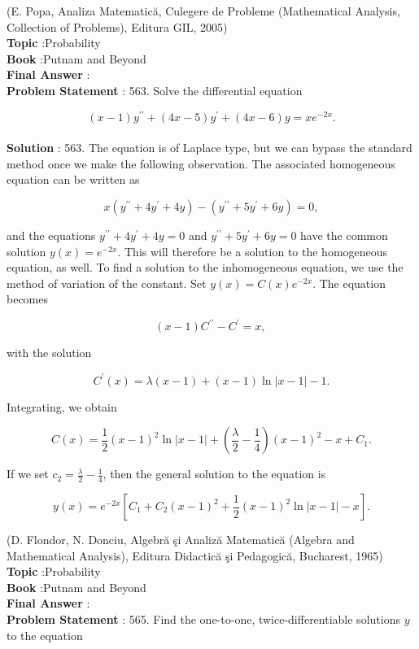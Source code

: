 \documentclass[10pt]{article}
\begin{document}
(E. Popa, Analiza Matematică, Culegere de Probleme (Mathematical Analysis, Collection of Problems), Editura GIL, 2005)
\\
\textbf{Topic} :Probability\\
\textbf{Book} :Putnam and Beyond\\
\textbf{Final Answer} :\\


\textbf{Problem Statement} :
563. Solve the differential equation

$$
(x-1) y^{\prime \prime}+(4 x-5) y^{\prime}+(4 x-6) y=x e^{-2 x} .
$$
\\
\textbf{Solution} :
563. The equation is of Laplace type, but we can bypass the standard method once we make the following observation. The associated homogeneous equation can be written as

$$
x\left(y^{\prime \prime}+4 y^{\prime}+4 y\right)-\left(y^{\prime \prime}+5 y^{\prime}+6 y\right)=0,
$$

and the equations $y^{\prime \prime}+4 y^{\prime}+4 y=0$ and $y^{\prime \prime}+5 y^{\prime}+6 y=0$ have the common solution $y(x)=e^{-2 x}$. This will therefore be a solution to the homogeneous equation, as well. To find a solution to the inhomogeneous equation, we use the method of variation of the constant. Set $y(x)=C(x) e^{-2 x}$. The equation becomes

$$
(x-1) C^{\prime \prime}-C^{\prime}=x \text {, }
$$

with the solution

$$
C^{\prime}(x)=\lambda(x-1)+(x-1) \ln |x-1|-1 .
$$

Integrating, we obtain

$$
C(x)=\frac{1}{2}(x-1)^{2} \ln |x-1|+\left(\frac{\lambda}{2}-\frac{1}{4}\right)(x-1)^{2}-x+C_{1} .
$$

If we set $c_{2}=\frac{\lambda}{2}-\frac{1}{4}$, then the general solution to the equation is

$$
y(x)=e^{-2 x}\left[C_{1}+C_{2}(x-1)^{2}+\frac{1}{2}(x-1)^{2} \ln |x-1|-x\right] .
$$

(D. Flondor, N. Donciu, Algebră şi Analiză Matematică (Algebra and Mathematical Analysis), Editura Didactică şi Pedagogică, Bucharest, 1965) 
\\
\textbf{Topic} :Probability\\
\textbf{Book} :Putnam and Beyond\\
\textbf{Final Answer} :\\


\textbf{Problem Statement} :
565. Find the one-to-one, twice-differentiable solutions $y$ to the equation
\end{document}
